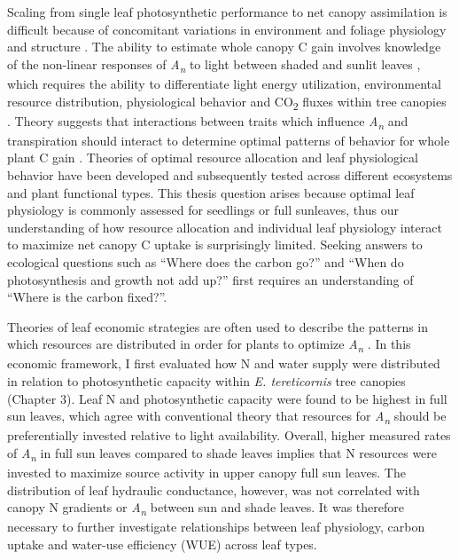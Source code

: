 \documentclass[a4paper]{article}\usepackage[]{graphicx}\usepackage[]{color}
\begin{document}
Scaling from single leaf photosynthetic performance to net canopy assimilation is difficult because of concomitant variations in environment and foliage physiology and structure \citep{niinemets2009packing}. The ability to estimate whole canopy C gain involves knowledge of the non-linear responses of \textit{A\textsubscript{n}} to light between shaded and sunlit leaves \citep{de1997simple, linderson2012up}, which requires the ability to differentiate  light energy utilization, environmental resource distribution, physiological behavior and CO\textsubscript{2} fluxes within tree canopies \citep{dai2004two, peltoniemi2012co, niinemets2012optimization}. Theory suggests that interactions between traits which influence \textit{A\textsubscript{n}} and transpiration should interact to determine optimal patterns of behavior for whole plant C gain \citep{cgivnish1988adaptation}. Theories of optimal resource allocation and leaf physiological behavior have been developed \citep{cowan1977stomatal, medlyn2011reconciling, peltoniemi2012co} and subsequently tested \citep{wright2003least, heroult2013optimal, prentice2014balancing, lin2015optimal} across different ecosystems and plant functional types. This thesis question arises because optimal leaf physiology is commonly assessed for seedlings or \textquotesingle full sun\textquotesingle leaves, thus our understanding of how resource allocation and individual leaf physiology interact to maximize net canopy C uptake is surprisingly limited. Seeking answers to ecological questions such as \enquote{Where does the carbon go?} and \enquote{When do photosynthesis and growth not add up?} first requires an understanding of \enquote{Where is the carbon fixed?}.

Theories of leaf economic strategies are often used to describe the patterns in which resources are distributed in order for plants to optimize \textit{A\textsubscript{n}} \citep{wright2003least}. In this economic framework, I first evaluated how N and water supply were distributed in relation to photosynthetic capacity within \textit{E. tereticornis} tree canopies (Chapter 3). Leaf N and photosynthetic capacity were found to be highest in full sun leaves, which agree with conventional theory that resources for \textit{A\textsubscript{n}} should be preferentially invested relative to light availability. Overall, higher measured rates of \textit{A\textsubscript{n}} in full sun leaves compared to shade leaves implies that N resources were invested to maximize source activity in upper canopy full sun leaves. The distribution of leaf hydraulic conductance, however, was not correlated with canopy N gradients or \textit{A\textsubscript{n}} between sun and shade leaves. It was therefore necessary to further investigate relationships between leaf physiology, carbon uptake and water-use efficiency (WUE) across leaf types.
\end{document}
